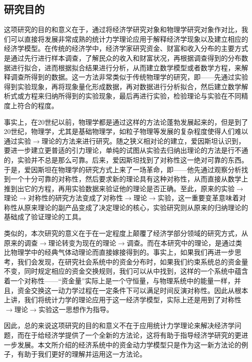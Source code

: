 \documentclass[tsinghuacite]{HustGraduPaper}
\begin{document}
		\subsection{研究目的}


		这项研究的目的和意义在于，通过将经济学研究对象和物理学研究对象作对比，我们可以直接将发展非常成熟的统计力学理论应用于解释经济学现象以及建立相应的经济学模型。在传统的经济学中，经济学家研究资金、财富和收入分布的主要方式是通过先行进行样本调查，了解民众的收入和财富状况，再根据调查得到的分布数据进行拟合，进而根据拟合结果进行分析，从而建立数学模型或者数学方程，来解释调查所得到的数据。这一方法非常类似于传统物理学的研究，即——先通过实验得到实验现象，再将现象量化形成数据，再对数据进行分析拟合，然后建立数学解析式或方程来归纳所得到的实验现象，最后再进行实验，检验理论与实验在不同精度上符合的程度。
	
			事实上，在20世纪以前，物理学都是通过这样的方法论蓬勃发展起来的，但是到了20世纪，物理学，尤其是基础物理学，如粒子物理等发展的复杂程度使得人们难以通过实验$\rightarrow$理论的方法来进行研究。随之狭义相对论的建立，爱因斯坦认识到，要进一步建立更普适的引力理论，单纯的试图从实验去归纳出理论的方法是行不通的，实验并不总是那么可靠。后来，爱因斯坦找到了对称性这一绝对可靠的东西。于是，爱因斯坦在物理学的研究方式上来了一场革命，即——他先通过观察分析找到一个十分可靠的对称性，然后要求新的理论具有这种对称性，从而直接从数学上推到出它的方程，再用实验数据来验证他的理论是否正确。至此，原来的实验$\rightarrow$理论$\rightarrow$对称性的研究方法变成了对称性$\rightarrow$理论$\rightarrow$实验，这一重要变革意味着对称性从原来理论的副产品变成了决定理论的核心，实验研究则从原来的归纳理论的基础成了验证理论的工具。
	
			类似的，本次研究的意义在于在一定程度上颠覆了经济学部分领域的研究方式，从原来的调查$\rightarrow$理论转变为现在的理论$\rightarrow$调查。而在本研究中的理论，是通过类比物理学中的经典气体动理论而直接嫁接得到的。事实上，如果我们再进一步思考，我们会发现，在研究社会系统中的资金分布时，如果我们约束系统总的资金量不变，同时规定相应的资金交换规则，我们可以从中找到，这样的一个系统中蕴含着一个对称性——“资金量”实际上是一个守恒量，与物理系统中的能量一样，并且，资金交换这一动力学过程在一定条件下可以满足时间反演对称性。因此从根本上讲，我们将统计力学的理论应用于这一经济学模型，实际上还是用到了对称性$\rightarrow$理论$\rightarrow$实验这一思想作为指导。
	
			因此，总的来说这项研究的目的和意义不在于应用统计力学理论来解决经济学问题，而在于给经济学提供了一个全新的方法论，这将有助于指导经济学研究的更进一步发展。本文所介绍的经济系统中的资金动力学模型只是作为这一新方法论的例子，有助于我们更好的理解并运用这一方法论。
		
\end{document}
